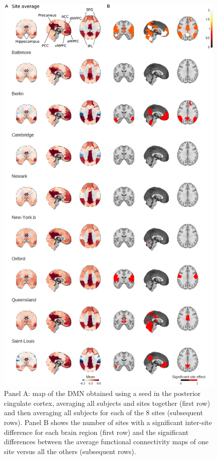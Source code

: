 \documentclass[authoryear]{elsarticle}
\begin{document}
\begin{figure}[htbp]
\begin{center}
\includegraphics[width=0.8\linewidth]{../figures/dmn_multisite.png}
\end{center}
\caption[DMN variability across sites]{
Panel A: map of the DMN obtained using a seed in the posterior cingulate cortex, averaging all subjects and sites together (first row) and then averaging all subjects for each of the 8 sites (subsequent rows). Panel B shows the number of sites with a significant inter-site difference for each brain region (first row) and the significant differences between the average functional connectivity maps of one site versus all the others (subsequent rows).
}
\label{fig_DMN_variability}
\end{figure}
\end{document}
